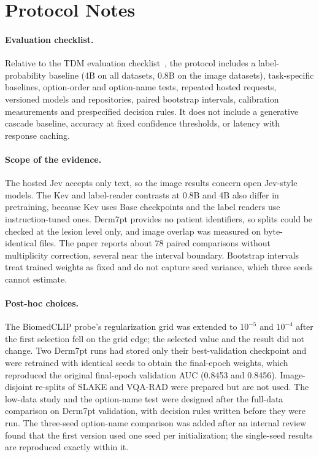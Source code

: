 \documentclass{article}
\begin{document}
\section{Protocol Notes}
\label{app:posthoc}
\paragraph{Evaluation checklist.} Relative to the TDM evaluation checklist~\citep{audit2026tdm}, the protocol includes a label-probability baseline (4B on all datasets, 0.8B on the image datasets), task-specific baselines, option-order and option-name tests, repeated hosted requests, versioned models and repositories, paired bootstrap intervals, calibration measurements and prespecified decision rules. It does not include a generative cascade baseline, accuracy at fixed confidence thresholds, or latency with response caching.

\paragraph{Scope of the evidence.} The hosted Jev accepts only text, so the image results concern open Jev-style models. The Kev and label-reader contrasts at 0.8B and 4B also differ in pretraining, because Kev uses Base checkpoints and the label readers use instruction-tuned ones. Derm7pt provides no patient identifiers, so splits could be checked at the lesion level only, and image overlap was measured on byte-identical files. The paper reports about 78 paired comparisons without multiplicity correction, several near the interval boundary. Bootstrap intervals treat trained weights as fixed and do not capture seed variance, which three seeds cannot estimate.

\paragraph{Post-hoc choices.} The BiomedCLIP probe's regularization grid was extended to $10^{-5}$ and $10^{-4}$ after the first selection fell on the grid edge; the selected value and the result did not change. Two Derm7pt runs had stored only their best-validation checkpoint and were retrained with identical seeds to obtain the final-epoch weights, which reproduced the original final-epoch validation AUC (0.8453 and 0.8456). Image-disjoint re-splits of SLAKE and VQA-RAD were prepared but are not used. The low-data study and the option-name test were designed after the full-data comparison on Derm7pt validation, with decision rules written before they were run. The three-seed option-name comparison was added after an internal review found that the first version used one seed per initialization; the single-seed results are reproduced exactly within it.
\end{document}
